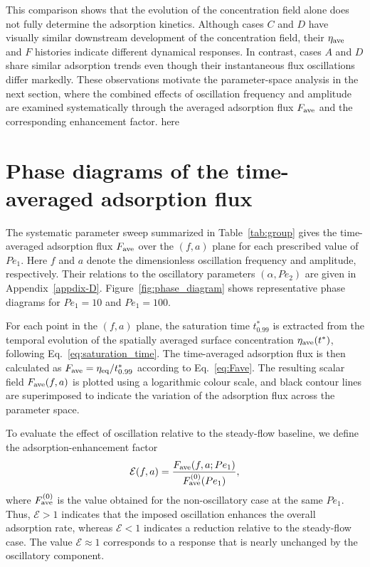\documentclass[lineno]{JFM-FLM_Au}
\begin{document}
{This comparison shows that the evolution of the concentration field alone does not fully determine the adsorption kinetics. Although cases $C$ and $D$ have visually similar downstream development of the concentration field, their $\eta_{\rm ave}$ and $F$ histories indicate different dynamical responses. In contrast, cases $A$ and $D$ share similar adsorption trends even though their instantaneous flux oscillations differ markedly. These observations motivate the parameter-space analysis in the next section, where the combined effects of oscillation frequency and amplitude are examined systematically through the averaged adsorption flux $F_{\rm ave}$ and the corresponding enhancement factor.
{\color{green}here}

}

\section{Phase diagrams of the time-averaged adsorption flux}
\label{sec:phase_diagrams}

The systematic parameter sweep summarized in Table~\ref{tab:group} gives
the time-averaged adsorption flux $F_{\rm ave}$ over the $(f,a)$ plane
for each prescribed value of $Pe_1$. Here $f$ and $a$ denote the
dimensionless oscillation frequency and amplitude, respectively. Their
relations to the oscillatory parameters $(\alpha,Pe_2)$ are given in
Appendix~\ref{appdix-D}. Figure~\ref{fig:phase_diagram} shows representative
phase diagrams for $Pe_1=10$ and $Pe_1=100$.

For each point in the $(f,a)$ plane, the saturation time $t_{0.99}^*$ is
extracted from the temporal evolution of the spatially averaged surface
concentration $\eta_{\rm ave}(t^*)$, following Eq.~\eqref{eq:saturation_time}.
The time-averaged adsorption flux is then calculated as
$F_{\rm ave}=\eta_{\rm eq}/t_{0.99}^*$ according to Eq.~\eqref{eq:Fave}.
The resulting scalar field $F_{\rm ave}(f,a)$ is plotted using a logarithmic
colour scale, and black contour lines are superimposed to indicate the
variation of the adsorption flux across the parameter space.

To evaluate the effect of oscillation relative to the steady-flow baseline,
we define the adsorption-enhancement factor
\begin{equation}
\mathcal{E}(f,a) =
\frac{F_{\rm ave}(f,a;Pe_1)}
{F_{\rm ave}^{(0)}(Pe_1)},
\label{eq:enhancement_factor}
\end{equation}
where $F_{\rm ave}^{(0)}$ is the value obtained for the non-oscillatory
case at the same $Pe_1$. Thus, $\mathcal{E}>1$ indicates that the imposed
oscillation enhances the overall adsorption rate, whereas $\mathcal{E}<1$
indicates a reduction relative to the steady-flow case. The value
$\mathcal{E}\approx 1$ corresponds to a response that is nearly unchanged
by the oscillatory component.
\end{document}
